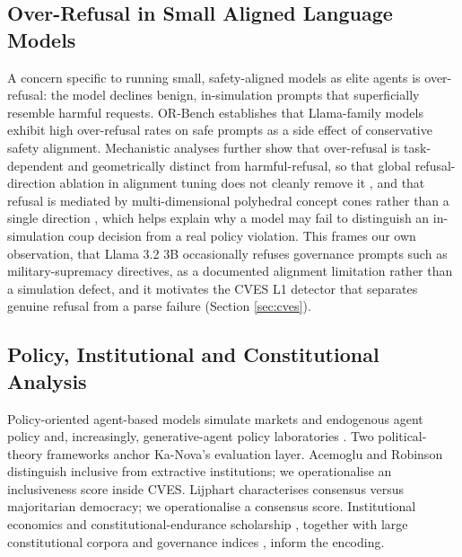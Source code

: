 \documentclass{ieeeaccess}
\begin{document}
\subsection{Over-Refusal in Small Aligned Language Models}
A concern specific to running small, safety-aligned models as elite
agents is over-refusal: the model declines benign, in-simulation prompts
that superficially resemble harmful requests. OR-Bench
\cite{cui2025orbench} establishes that Llama-family models exhibit high
over-refusal rates on safe prompts as a side effect of conservative
safety alignment. Mechanistic analyses further show that over-refusal is
task-dependent and geometrically distinct from harmful-refusal, so that
global refusal-direction ablation in alignment tuning does not cleanly
remove it \cite{maskey2026overrefusal}, and that refusal is mediated by
multi-dimensional polyhedral concept cones rather than a single
direction \cite{wollschlager2025geometry}, which helps explain why a
model may fail to distinguish an in-simulation coup decision from a real
policy violation. This frames our own observation, that Llama 3.2 3B
occasionally refuses governance prompts such as military-supremacy
directives, as a documented alignment limitation rather than a
simulation defect, and it motivates the CVES L1 detector that separates
genuine refusal from a parse failure (Section \ref{sec:cves}).

\subsection{Policy, Institutional and Constitutional Analysis}
Policy-oriented agent-based models simulate markets and endogenous
agent policy \cite{furtado2022policyspace2,dawid2018agent,
geanakoplos2012getting} and, increasingly, generative-agent policy
laboratories \cite{piao2025gplab}. Two political-theory frameworks
anchor Ka-Nova's evaluation layer. Acemoglu and Robinson
\cite{acemoglu2012why,acemoglu2006economic} distinguish inclusive from
extractive institutions; we operationalise an inclusiveness score inside
CVES. Lijphart \cite{lijphart2012patterns,lijphart1977democracy}
characterises consensus versus majoritarian democracy; we operationalise
a consensus score. Institutional economics \cite{north1990institutions,
ostrom1990governing} and constitutional-endurance scholarship
\cite{elkins2009endurance}, together with large constitutional corpora
and governance indices \cite{ccp2023constitute,coppedge2026vdem16,
marshall2020polity5,law2013sham}, inform the encoding.
\end{document}

